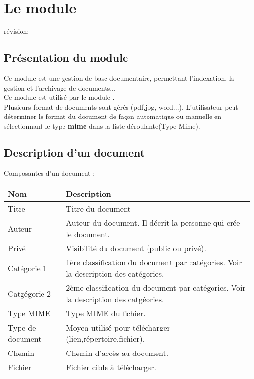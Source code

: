 
\clearpage
\section{Le module \doc}
 
révision: 
 
\subsection{Présentation du module \doc}

Ce module est une gestion de base documentaire, permettant l'indexation, la gestion et l'archivage de documents...\\

Ce module est utilisé par le module \cv.\\

Plusieurs format de documents sont gérés (pdf,jpg, word...). L'utilisateur peut déterminer le format du document de façon automatique ou manuelle en sélectionnant le type \textbf{mime} dans la liste déroulante(Type Mime).\\

\subsection{Description d'un document}

Composantes d'un document :\\

\begin{tabular}{|p{3cm}|p{10cm}|}
\hline
\textbf{Nom} & \textbf{Description} \\
\hline
Titre & Titre du document\\
\hline
Auteur & Auteur du document. Il décrit la personne qui crée le document.\\
\hline
Privé & Visibilité du document (public ou privé).\\
\hline
Catégorie 1 & 1ère classification du document par catégories. Voir la description des catégories.\\
\hline
Catgégorie 2 & 2ème classification du document par catégories. Voir la description des catgéories.\\
\hline
Type MIME & Type MIME du fichier.\\
\hline
Type de document & Moyen utilisé pour télécharger (lien,répertoire,fichier).\\
\hline
Chemin & Chemin d'accès au document.\\
\hline
Fichier & Fichier cible à télécharger.\\
\hline
\end{tabular}
\vspace{0.3cm}


